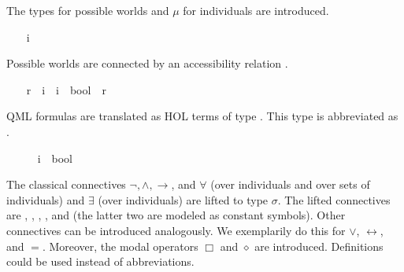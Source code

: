 \begin{isabellebody}
%
\isamarkuptrue%
%
\isamarkuptrue%
%
\begin{isamarkuptext}%
The types  for possible worlds and $\mu$ for individuals 
are introduced.%
\end{isamarkuptext}%
\isamarkuptrue%
\ \ \isamarkupfalse%
\ i\ \ \ \ %
\ \isanewline
\ \ \isamarkupfalse%
\ {\isasymmu}\ \ \ \ %
%
\begin{isamarkuptext}%
Possible worlds are connected by an accessibility relation .%
\end{isamarkuptext}%
\isamarkuptrue%
\ \ \isamarkupfalse%
\ r\ {\isacharcolon}{\isacharcolon}\ {\isachardoublequoteopen}i\ {\isasymRightarrow}\ i\ {\isasymRightarrow}\ bool{\isachardoublequoteclose}\ {\isacharparenleft}\ {\isachardoublequoteopen}r{\isachardoublequoteclose}\ {}{}{\isacharparenright}\ \ \ \ %
%
\begin{isamarkuptext}%
QML formulas are translated as HOL terms of type . 
This type is abbreviated as \isa{{\isasymsigma}}.%
\end{isamarkuptext}%
\isamarkuptrue%
\ \ \isamarkupfalse%
\ {\isasymsigma}\ {\isacharequal}\ {\isachardoublequoteopen}{\isacharparenleft}i\ {\isasymRightarrow}\ bool{\isacharparenright}{\isachardoublequoteclose}%
\begin{isamarkuptext}%
The classical connectives $\neg, \wedge, \rightarrow$, and $\forall$
(over individuals and over sets of individuals) and $\exists$ (over individuals) are
lifted to type $\sigma$. The lifted connectives are , , ,
\isa{{\isasymforall}}, and \isa{{\isasymexists}} (the latter two are modeled as constant symbols). 
Other connectives can be introduced analogously. We exemplarily do this for $\vee$, 
$\leftrightarrow$, and $=$. Moreover, the modal operators $\Box$ and $\diamond$ are introduced.
Definitions could be used instead of abbreviations.%
\end{isamarkuptext}%
\isamarkuptrue%
\ \ \isamarkupfalse%

\end{isabellebody}
